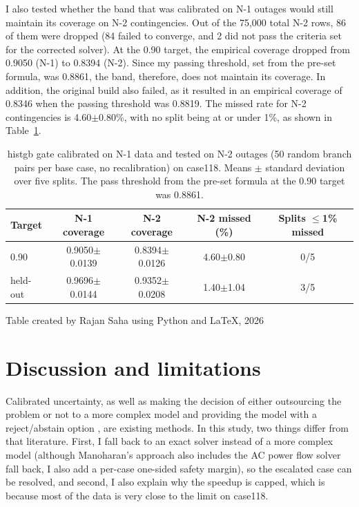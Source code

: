 \documentclass[12pt]{article}
\begin{document}
I also tested whether the band that was calibrated on N-1 outages would still maintain its coverage on N-2 contingencies. Out of the 75{,}000 total N-2 rows, 86 of them were dropped (84 failed to converge, and 2 did not pass the criteria set for the corrected solver). At the 0.90 target, the empirical coverage dropped from 0.9050 (N-1) to 0.8394 (N-2). Since my passing threshold, set from the pre-set formula, was 0.8861, the band, therefore, does not maintain its coverage. In addition, the original build also failed, as it resulted in an empirical coverage of 0.8346 when the passing threshold was 0.8819. The missed rate for N-2 contingencies is 4.60$\pm$0.80\%, with no split being at or under 1\%, as shown in Table~\ref{tab:n2}.

\begin{table}[htbp]
\centering
\caption{histgb gate calibrated on N-1 data and tested on N-2 outages (50 random branch pairs per base case, no recalibration) on case118. Means $\pm$ standard deviation over five splits. The pass threshold from the pre-set formula at the 0.90 target was 0.8861.}
\label{tab:n2}
\small
\setlength{\tabcolsep}{5pt}
\begin{tabular}{lcccc}
\toprule
Target & N-1 coverage & N-2 coverage & N-2 missed (\%) & Splits $\le$1\% missed \\
\midrule
0.90     & 0.9050$\pm$0.0139 & 0.8394$\pm$0.0126 & 4.60$\pm$0.80 & 0/5 \\
held-out & 0.9696$\pm$0.0144 & 0.9352$\pm$0.0208 & 1.40$\pm$1.04 & 3/5 \\
\bottomrule
\end{tabular}

\vspace*{1ex}
{\small Table created by Rajan Saha using Python and \LaTeX, 2026}
\end{table}

\section{Discussion and limitations}
\label{sec:discussion}

Calibrated uncertainty, as well as making the decision of either outsourcing the problem or not to a more complex model \cite{desalvo2015} and providing the model with a reject/abstain option \cite{cortes2016,chow1970,elyaniv2010}, are existing methods. In this study, two things differ from that literature. First, I fall back to an exact solver instead of a more complex model (although Manoharan’s approach also includes the AC power flow solver fall back, I also add a per-case one-sided safety margin), so the escalated case can be resolved, and second, I also explain why the speedup is capped, which is because most of the data is very close to the limit on case118.
\end{document}
